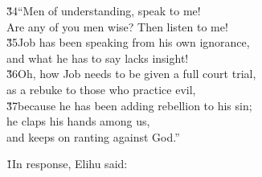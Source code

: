 \begin{poetry}
\poeml \v{34}``Men of understanding, speak to me! \\
\poemll    Are any of you men wise? Then listen to me! \\
\poeml \v{35}Job has been speaking from his own ignorance, \\
\poemll    and what he has to say lacks insight! \\
\poeml \v{36}Oh, how Job needs to be given a full court trial, \\
\poemll    as a rebuke to those who practice evil, \\
\poeml \v{37}because he has been adding rebellion to his sin; \\
\poemll    he claps his hands among us, \\
\poemlll       and keeps on ranting against God.''
\end{poetry}

\v{1}In response, Elihu said:

